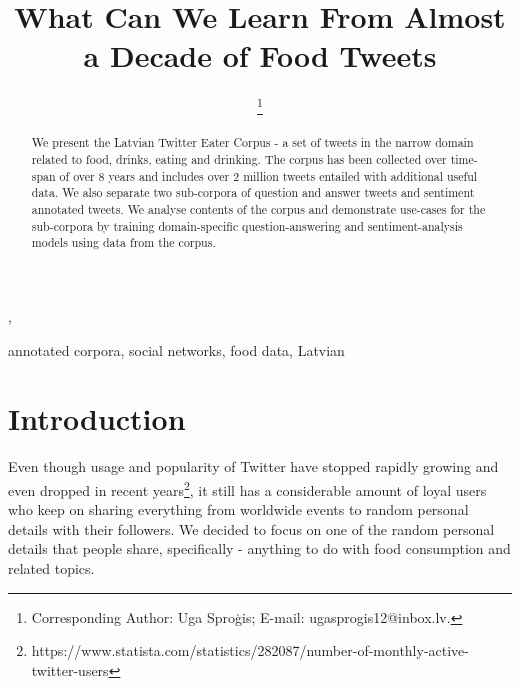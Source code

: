 \documentclass{IOS-Book-Article}
\def\hb{\hbox to 10.7 cm{}}
\begin{document}
\pagestyle{headings}
\def\thepage{}

\begin{frontmatter}              

\title{What Can We Learn From Almost a Decade of Food Tweets}

\markboth{}{April 2020\hb}




\author[A]{
    \thanks{Corresponding Author: Uga Sproģis; E-mail: ugasprogis12@inbox.lv.}
},
\author[B]{
}

\address[A]{Faculty of Computing, University of Latvia}
\address[B]{The University of Tokyo}

\begin{abstract}
    We present the Latvian Twitter Eater Corpus - a set of tweets in the narrow domain related to food, drinks, eating and drinking. The corpus has been collected over time-span of over 8 years and includes over 2 million tweets entailed with additional useful data. We also separate two sub-corpora of question and answer tweets and sentiment annotated tweets. We analyse contents of the corpus and demonstrate use-cases for the sub-corpora by training domain-specific question-answering and sentiment-analysis models using data from the corpus.
\end{abstract}

\begin{keyword}
    annotated corpora\sep 
    social networks\sep 
    food data\sep 
    Latvian
\end{keyword}
\end{frontmatter}
\markboth{April 2020\hb}{April 2020\hb}


\section{Introduction}

Even though usage and popularity of Twitter have stopped rapidly growing and even dropped in recent years\footnote{https://www.statista.com/statistics/282087/number-of-monthly-active-twitter-users}, it still has a considerable amount of loyal users who keep on sharing everything from worldwide events to random personal details with their followers. We decided to focus on one of the random personal details that people share, specifically - anything to do with food consumption and related topics. 
\end{document}
